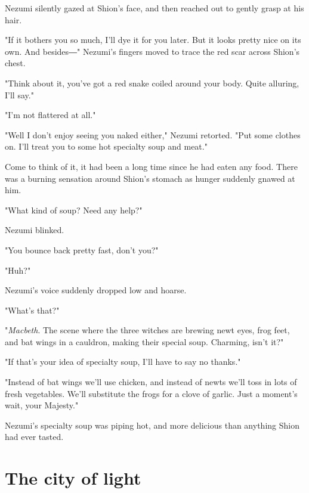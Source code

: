 Nezumi silently gazed at Shion's face, and then reached out to gently
grasp at his hair.

"If it bothers you so much, I'll dye it for you later. But it looks
pretty nice on its own. And besides―" Nezumi's fingers moved to trace
the red scar across Shion's chest.

"Think about it, you've got a red snake coiled around your body. Quite
alluring, I'll say."

"I'm not flattered at all."

"Well I don't enjoy seeing you naked either," Nezumi retorted. "Put some
clothes on. I'll treat you to some hot specialty soup and meat."

Come to think of it, it had been a long time since he had eaten any
food. There was a burning sensation around Shion's stomach as hunger
suddenly gnawed at him.

"What kind of soup? Need any help?"

Nezumi blinked.

"You bounce back pretty fast, don't you?"

"Huh?"

Nezumi's voice suddenly dropped low and hoarse.


"What's that?"

"\emph{Macbeth}. The scene where the three witches are brewing newt eyes, frog
feet, and bat wings in a cauldron, making their special soup. Charming,
isn't it?"

"If that's your idea of specialty soup, I'll have to say no thanks."

"Instead of bat wings we'll use chicken, and instead of newts we'll toss
in lots of fresh vegetables. We'll substitute the frogs for a clove of
garlic. Just a moment's wait, your Majesty."

Nezumi's specialty soup was piping hot, and more delicious than anything
Shion had ever tasted.

\chapter{The city of light}

